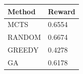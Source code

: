 \begin{tabular}{ll}
\hline
Method & Reward \\
\hline
  MCTS & 0.6554 \\
  RANDOM & 0.6674 \\
  GREEDY & 0.4278 \\
  GA & 0.6178 \\
\hline
\end{tabular}
